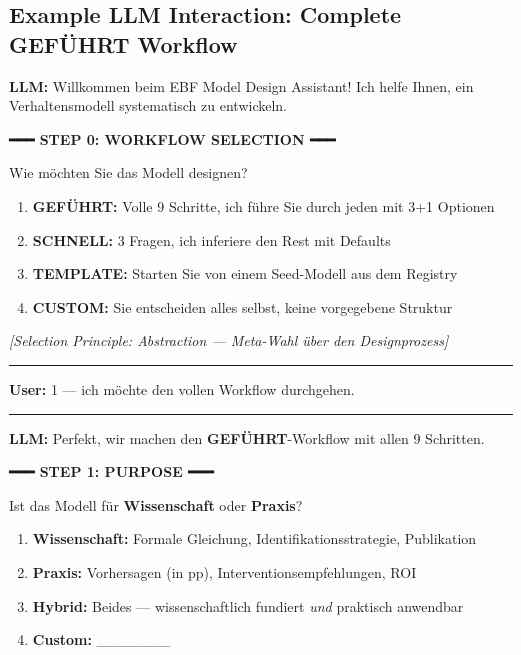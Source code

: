 \subsection{Example LLM Interaction: Complete GEFÜHRT Workflow}

\begin{tcolorbox}[colback=blue!5!white, colframe=blue!75!black,
    title=Example: GEFÜHRT Model Design (All 10 Steps), breakable]
\small
\textbf{LLM:} Willkommen beim EBF Model Design Assistant! Ich helfe Ihnen,
ein Verhaltensmodell systematisch zu entwickeln.

\vspace{0.3em}
\textbf{━━━ STEP 0: WORKFLOW SELECTION ━━━}
\vspace{0.3em}

Wie möchten Sie das Modell designen?
\begin{enumerate}
\item \textbf{GEFÜHRT:} Volle 9 Schritte, ich führe Sie durch jeden mit 3+1 Optionen
\item \textbf{SCHNELL:} 3 Fragen, ich inferiere den Rest mit Defaults
\item \textbf{TEMPLATE:} Starten Sie von einem Seed-Modell aus dem Registry
\item \textbf{CUSTOM:} Sie entscheiden alles selbst, keine vorgegebene Struktur
\end{enumerate}

\textit{[Selection Principle: Abstraction --- Meta-Wahl über den Designprozess]}

\hrule
\vspace{0.3em}

\textbf{User:} 1 --- ich möchte den vollen Workflow durchgehen.

\hrule
\vspace{0.3em}

\textbf{LLM:} Perfekt, wir machen den \textbf{GEFÜHRT}-Workflow mit allen 9 Schritten.

\vspace{0.3em}
\textbf{━━━ STEP 1: PURPOSE ━━━}
\vspace{0.3em}

Ist das Modell für \textbf{Wissenschaft} oder \textbf{Praxis}?
\begin{enumerate}
\item \textbf{Wissenschaft:} Formale Gleichung, Identifikationsstrategie, Publikation
\item \textbf{Praxis:} Vorhersagen (in pp), Interventionsempfehlungen, ROI
\item \textbf{Hybrid:} Beides --- wissenschaftlich fundiert \textit{und} praktisch anwendbar
\item \textbf{Custom:} \_\_\_\_\_\_\_
\end{enumerate}


\end{tcolorbox}
